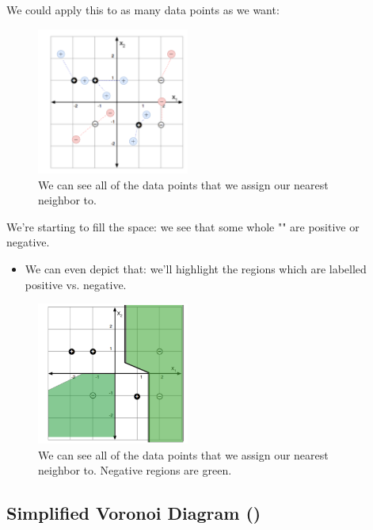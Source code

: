        We could apply this to as many data points as we want:
    
        \begin{figure}[H]
            \centering
            \includegraphics[width=50mm,scale=0.5]{images/nonparametric_images/many_data_nearest_neighbor.png}
    
            \caption*{We can see all of the data points that we assign our nearest neighbor to.}
        \end{figure}
    
        We're starting to fill the space: we see that some whole "" are positive or negative. 
        
        \begin{itemize}
            \item We can even depict that: we'll highlight the regions which are labelled positive vs. negative.
        \end{itemize}
    
        \begin{figure}[H]
            \centering
            \includegraphics[width=50mm,scale=0.5]{images/nonparametric_images/nearest_neighbor.png}
    
            \caption*{We can see all of the data points that we assign our nearest neighbor to. Negative regions are green.}
        \end{figure}


    \phantom{}

    \subsection{Simplified Voronoi Diagram ()}

